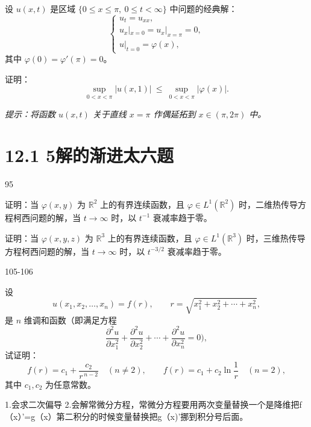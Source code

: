 \begin{homework}[5]
设 $u(x,t)$ 是区域 $\{0\le x\le \pi,\ 0\le t<\infty\}$ 中问题的经典解：
\[
\begin{cases}
u_t=u_{xx},\\[4pt]
u_x|_{x=0}=u_x|_{x=\pi}=0,\\[4pt]
u|_{t=0}=\varphi(x),
\end{cases}
\]
其中 $\varphi(0)=\varphi'(\pi)=0$。

证明：
\[
\sup_{0<x<\pi}|u(x,1)|\ \le\ \sup_{0<x<\pi}|\varphi(x)|.
\]

\textit{提示：将函数 $u(x,t)$ 关于直线 $x=\pi$ 作偶延拓到 $x\in(\pi,2\pi)$ 中。}
\end{homework}





   

\section{12.1 5解的渐进太六题}
95

\begin{homework}[2]
证明：当 $\varphi(x,y)$ 为 $\mathbb R^2$ 上的有界连续函数，且 $\varphi\in L^1(\mathbb R^2)$ 时，二维热传导方程柯西问题的解，当 $t\to\infty$ 时，以 $t^{-1}$ 衰减率趋于零。
\end{homework}




\begin{homework}[3]
证明：当 $\varphi(x,y,z)$ 为 $\mathbb R^3$ 上的有界连续函数，且 $\varphi\in L^1(\mathbb R^3)$ 时，三维热传导方程柯西问题的解，当 $t\to\infty$ 时，以 $t^{-3/2}$ 衰减率趋于零。
\end{homework}

105-106

\begin{homework}[1]
设
\[
u(x_1,x_2,\dots,x_n)=f(r),\qquad
r=\sqrt{x_1^2+x_2^2+\cdots+x_n^2},
\]
是 $n$ 维调和函数（即满足方程
\[
\frac{\partial^2 u}{\partial x_1^2}
+\frac{\partial^2 u}{\partial x_2^2}
+\cdots
+\frac{\partial^2 u}{\partial x_n^2}=0),
\]
试证明：
\[
f(r)=c_1+\frac{c_2}{r^{\,n-2}}\quad (n\ne 2),\qquad
f(r)=c_1+c_2\ln\frac1r\quad (n=2),
\]
其中 $c_1,c_2$ 为任意常数。
\end{homework}

\begin{dxtips}
 1.会求二次偏导
 2.会解常微分方程，常微分方程要用两次变量替换一个是降维把f（x）’=g（x）第二积分的时候变量替换把g（x)'挪到积分号后面。
\end{dxtips}
    





